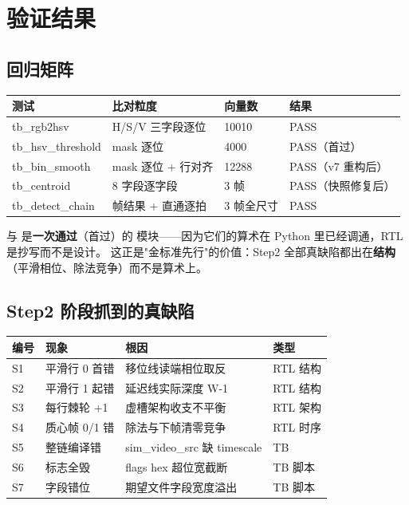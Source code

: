 \section{验证结果}

\subsection{回归矩阵}

\begin{center}
\begin{tabular}{llll}
\toprule
\rowcolor{rowtint}\textbf{测试} & \textbf{比对粒度} & \textbf{向量数} & \textbf{结果} \\
\midrule
tb\_rgb2hsv & H/S/V 三字段逐位 & 10010 & PASS \\
tb\_hsv\_threshold & mask 逐位 & 4000 & PASS（首过） \\
tb\_bin\_smooth & mask 逐位 + 行对齐 & 12288 & PASS（v7 重构后） \\
tb\_centroid & 8 字段逐字段 & 3 帧 & PASS（快照修复后） \\
tb\_detect\_chain & 帧结果 + 直通逐拍 & 3 帧全尺寸 & PASS \\
\bottomrule
\end{tabular}
\end{center}

 与  是\textbf{一次通过}（首过）的
模块——因为它们的算术在 Python 里已经调通，RTL 是抄写而不是设计。
这正是"金标准先行"的价值：Step2 全部真缺陷都出在\textbf{结构}
（平滑相位、除法竞争）而不是算术上。

\subsection{Step2 阶段抓到的真缺陷}

\begin{center}
\begin{tabular}{llp{5.2cm}l}
\toprule
\rowcolor{rowtint}\textbf{编号} & \textbf{现象} & \textbf{根因} & \textbf{类型} \\
\midrule
S1 & 平滑行 0 首错 & 移位线读端相位取反 & RTL 结构 \\
S2 & 平滑行 1 起错 & 延迟线实际深度 W-1 & RTL 结构 \\
S3 & 每行棘轮 +1 & 虚槽架构收支不平衡 & RTL 架构 \\
S4 & 质心帧 0/1 错 & 除法与下帧清零竞争 & RTL 时序 \\
S5 & 整链编译错 & sim\_video\_src 缺 timescale & TB \\
S6 & 标志全毁 & flags hex 超位宽截断 & TB 脚本 \\
S7 & 字段错位 & 期望文件字段宽度溢出 & TB 脚本 \\
\bottomrule
\end{tabular}
\end{center}

